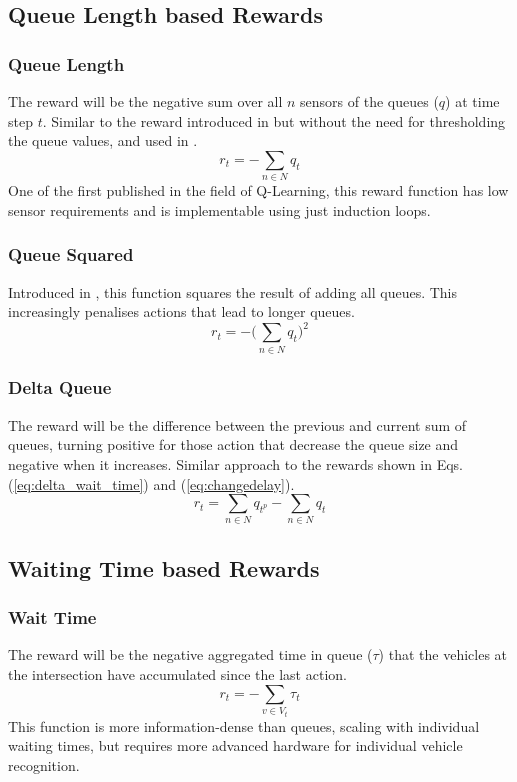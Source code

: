 \documentclass[conference]{IEEEtran}
\begin{document}
\subsection{Queue Length based Rewards}
\subsubsection{Queue Length}
The reward will be the negative sum over all $n$ sensors of the queues ($q$) at time step $t$.
Similar to the reward introduced in \cite{prashanth2011} but without the need for thresholding the queue values, and used in \cite{aslani2019}.
\begin{equation}
    r_t = - \sum_{n \in N} q_{t}
\label{eq:queue}
\end{equation}
One of the first published in the field of Q-Learning, this reward function has low sensor requirements and is implementable using just induction loops.

\subsubsection{Queue Squared}
Introduced in \cite{gendersthesis}, this function squares the result of adding all queues.
This increasingly penalises actions that lead to longer queues.
\begin{equation}
   r_t = - \bigg( \sum_{n \in N} q_{t} \bigg)^2
\label{eq:queuesq} 
\end{equation}

\subsubsection{Delta Queue}
The reward will be the difference between the previous and current sum of queues, turning positive for those action that decrease the queue size and negative when it increases.
Similar approach to the rewards shown in Eqs. (\ref{eq:delta_wait_time}) and (\ref{eq:changedelay}).
\begin{equation}
    r_t = \sum_{n \in N} q_{t^p} - \sum_{n \in N} q_{t}
    \label{deltaqueue}
\end{equation}

\subsection{Waiting Time based Rewards}
\subsubsection{Wait Time}
The reward will be the negative aggregated time in queue ($\tau$) that the vehicles at the intersection have accumulated since the last action. 
\begin{equation}
r_t = - \sum_{v \in V_t} \tau_{t}
\label{eq:wait_time}
\end{equation}
This function is more information-dense than queues, scaling with individual waiting times, but requires more advanced hardware for individual vehicle recognition.
\end{document}
